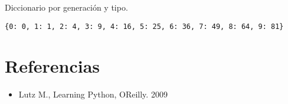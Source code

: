 \begin{code} Diccionario por generación y tipo.

\begin{Shaded}
\begin{Highlighting}[]
\OperatorTok{*} \NormalTok{(}\NormalTok{))}
\end{Highlighting}
\end{Shaded}

\begin{verbatim}
{0: 0, 1: 1, 2: 4, 3: 9, 4: 16, 5: 25, 6: 36, 7: 49, 8: 64, 9: 81}
\end{verbatim}
\end{code}

\section{Referencias}

\begin{itemize}
\item
  Lutz M., Learning Python, O\textquotesingle Reilly. 2009
\end{itemize}

